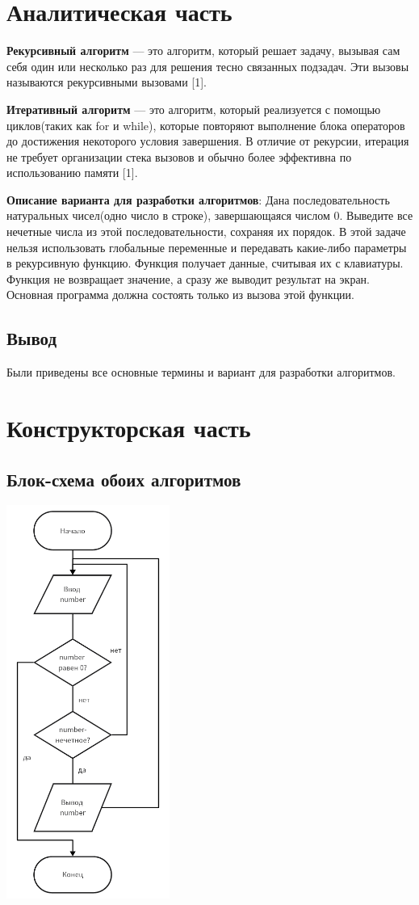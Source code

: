 \documentclass[14pt]{article}
\begin{document}
	\section{Аналитическая часть}
	\textbf{Рекурсивный алгоритм} --- это алгоритм, который решает задачу, вызывая сам себя один или несколько раз для решения тесно связанных подзадач. Эти вызовы называются рекурсивными вызовами [1].\par
	\textbf{Итеративный алгоритм} --- это алгоритм, который реализуется с помощью циклов(таких как for и while), которые повторяют выполнение блока операторов до достижения некоторого условия завершения. В отличие от рекурсии, итерация не требует организации стека вызовов и обычно более эффективна по использованию памяти [1].\par
	\textbf{Описание варианта для разработки алгоритмов}: Дана последовательность натуральных чисел(одно число в строке), завершающаяся числом 0. Выведите все нечетные числа из этой последовательности, сохраняя их порядок. В этой задаче нельзя использовать глобальные переменные и передавать какие-либо параметры в рекурсивную функцию. Функция получает данные, считывая их с клавиатуры. Функция не возвращает значение, а сразу же выводит результат на экран. Основная программа должна состоять только из вызова этой функции.
	\subsection{Вывод}
	Были приведены все основные термины и вариант для разработки алгоритмов.
	\newpage
	\section{Конструкторская часть}
	\subsection*{Блок-схема обоих алгоритмов}
	\begin{center}
		\includegraphics[width = 0.4\textwidth]{scheme.png}
	\end{center}
\end{document}
